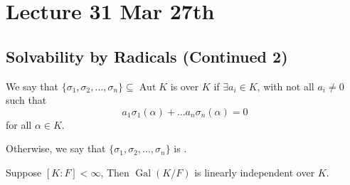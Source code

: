 \documentclass[notoc,notitlepage,nobib]{tufte-book}
\DeclareMathOperator{\Aut}{Aut}
\DeclareMathOperator{\Gal}{Gal}
\begin{document}


\chapter{Lecture 31 Mar 27th}%
\label{chp:lecture_31_mar_27th}

\section{Solvability by Radicals (Continued 2)}%
\label{sec:solvability_by_radicals_continued_2}

\begin{defn}\label{defn:linearly_dependent_and_independent}
  We say that $\{ \sigma_1, \sigma_2, \ldots, \sigma_n \} \subseteq \Aut K$ is
   over $K$ if $\exists a_i \in K$, with not all
  $a_i \neq 0$ such that
  \begin{equation*}
    a_1 \sigma_1(\alpha) + \hdots a_n \sigma_n(\alpha) = 0
  \end{equation*}
  for all $\alpha \in K$.

  Otherwise, we say that $\{ \sigma_1, \sigma_2, \ldots, \sigma_n \}$ is
  .
\end{defn}

\begin{lemma}\label{lemma:the_galois_group_is_linearly_independent}
  Suppose $[K : F] < \infty$, Then $\Gal( K / F )$ is linearly independent over
  $K$.
\end{lemma}
\end{document}
